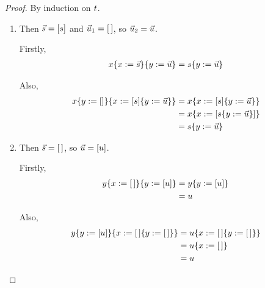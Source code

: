 \begin{proof}
By induction on $t$.
\begin{enumerate}
\item {}
Then $\vec{s} = [s]$ and $\vec{u}_1 = [\,]$,
so $\vec{u}_2 = \vec{u}$.

Firstly,
\begin{equation*}\begin{split}
  x\{x := \vec{s}\}\{y := \vec{u}\} &
                                        = s\{y := \vec{u}\} \\
\end{split}\end{equation*}

Also,
\begin{equation*}\begin{split}
  x\{y := []\}\{x := [s]\{y := \vec{u}\}\}
                   & = x\{x := [s]\{y := \vec{u}\}\} \\
                   & = x\{x := [s\{y := \vec{u}\}]\} \\
                   & = s\{y := \vec{u}\} \\
\end{split}\end{equation*}

\item {}
Then $\vec{s} = [\,]$, so $\vec{u} = [u]$.

Firstly,
\begin{equation*}\begin{split}
  y\{x := [\,]\}\{y := [u]\}
                   & = y\{y := [u]\} \\
                   & = u \\
\end{split}\end{equation*}

Also,
\begin{equation*}\begin{split}
  y\{y := [u]\}\{x := [\,]\{y := [\,]\}\}
                   & = u\{x := [\,]\{y := [\,]\}\} \\
                   & = u\{x := [\,]\} \\
                   & = u \\
\end{split}\end{equation*}


\end{enumerate}
\end{proof}
